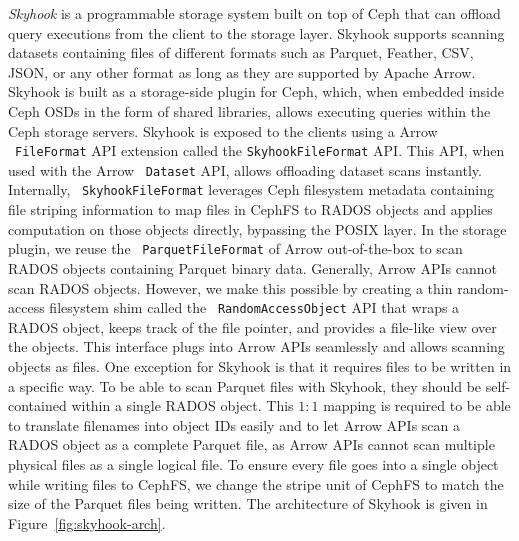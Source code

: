 \documentclass[11pt]{article}
\newcommand{\code}[1]{\colorbox{light-gray}{\texttt{#1}}}
\begin{document}
\textit{Skyhook} is a programmable storage system built on top of Ceph that can offload query executions from the client to the storage layer. Skyhook supports scanning datasets containing files of different formats such as Parquet, Feather, CSV, JSON, or any other format as long as they are supported by Apache Arrow. Skyhook is built as a storage-side plugin for Ceph, which, when embedded inside Ceph OSDs in the form of shared libraries, allows executing queries within the Ceph storage servers. Skyhook is exposed to the clients using a Arrow ~\code{FileFormat} API extension called the \code{SkyhookFileFormat} API. This API, when used with the Arrow ~\code{Dataset} API, allows offloading dataset scans instantly. Internally, ~\code{SkyhookFileFormat} leverages Ceph filesystem metadata containing file striping information to map files in CephFS to RADOS objects and applies computation on those objects directly, bypassing the POSIX layer. In the storage plugin, we reuse the ~\code{ParquetFileFormat} of Arrow out-of-the-box to scan RADOS objects containing Parquet binary data. Generally, Arrow APIs cannot scan RADOS objects. However, we make this possible by creating a thin random-access filesystem shim called the ~\code{RandomAccessObject} API that wraps a RADOS object, keeps track of the file pointer, and provides a file-like view over the objects. This interface plugs into Arrow APIs seamlessly and allows scanning objects as files. One exception for Skyhook is that it requires files to be written in a specific way. To be able to scan Parquet files with Skyhook, they should be self-contained within a single RADOS object. This $1:1$ mapping is required to be able to translate filenames into object IDs easily and to let Arrow APIs scan a RADOS object as a complete Parquet file, as Arrow APIs cannot scan multiple physical files as a single logical file. To ensure every file goes into a single object while writing files to CephFS, we change the stripe unit of CephFS to match the size of the Parquet files being written. The architecture of Skyhook is given in Figure~\ref{fig:skyhook-arch}.
\end{document}
